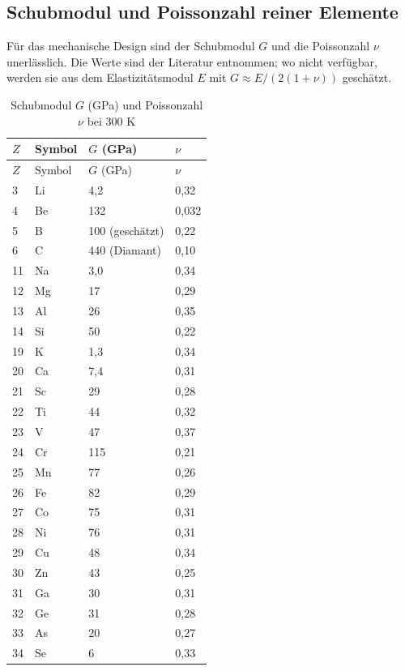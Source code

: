 \documentclass[12pt,a4paper]{article}
\begin{document}
	\subsection{Schubmodul und Poissonzahl reiner Elemente}
	\label{subsec:elastic-constants}
	
	Für das mechanische Design sind der Schubmodul \(G\) und die Poissonzahl \(\nu\) unerlässlich. Die Werte sind der Literatur entnommen; wo nicht verfügbar, werden sie aus dem Elastizitätsmodul \(E\) mit \(G \approx E/(2(1+\nu))\) geschätzt.
	
	\begin{longtable}{p{0.6cm}p{1.2cm}p{1.5cm}p{1.5cm}}
		\caption{Schubmodul \(G\) (GPa) und Poissonzahl \(\nu\) bei 300 K} \label{tab:elastic-constants-all} \\
		\toprule
		\(Z\) & Symbol & \(G\) (GPa) & \(\nu\) \\
		\midrule
		\endfirsthead
		\toprule
		\(Z\) & Symbol & \(G\) (GPa) & \(\nu\) \\
		\midrule
		\endhead
		3  & Li & 4,2 & 0,32 \\
		4  & Be & 132 & 0,032 \\
		5  & B  & 100 (geschätzt) & 0,22 \\
		6  & C  & 440 (Diamant) & 0,10 \\
		11 & Na & 3,0 & 0,34 \\
		12 & Mg & 17 & 0,29 \\
		13 & Al & 26 & 0,35 \\
		14 & Si & 50 & 0,22 \\
		19 & K  & 1,3 & 0,34 \\
		20 & Ca & 7,4 & 0,31 \\
		21 & Sc & 29 & 0,28 \\
		22 & Ti & 44 & 0,32 \\
		23 & V  & 47 & 0,37 \\
		24 & Cr & 115 & 0,21 \\
		25 & Mn & 77 & 0,26 \\
		26 & Fe & 82 & 0,29 \\
		27 & Co & 75 & 0,31 \\
		28 & Ni & 76 & 0,31 \\
		29 & Cu & 48 & 0,34 \\
		30 & Zn & 43 & 0,25 \\
		31 & Ga & 30 & 0,31 \\
		32 & Ge & 31 & 0,28 \\
		33 & As & 20 & 0,27 \\
		34 & Se & 6 & 0,33 \\

\end{longtable}
\end{document}
